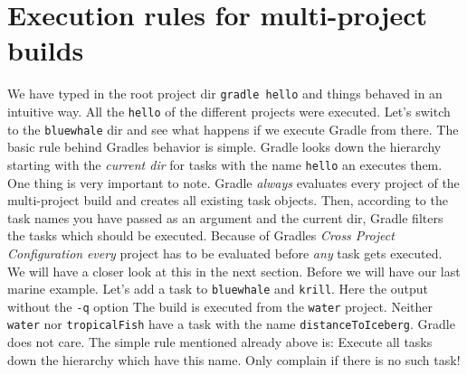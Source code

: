 


\section{Execution rules for multi-project builds} %
\label{sec:execution_rules_for_multi_project_builds}
We have typed in the root project dir \texttt{gradle hello} and things behaved in an intuitive way. All the \texttt{hello} of the different projects were executed. Let's switch to the \texttt{bluewhale} dir and see what happens if we execute Gradle from there. 
The basic rule behind Gradles behavior is simple. Gradle looks down the hierarchy starting with the \emph{current dir} for tasks with the name \texttt{hello} an executes them. One thing is very important to note. Gradle \emph{always} evaluates every project of the multi-project build and creates all existing task objects. Then, according to the task names you have passed as an argument and the current dir, Gradle filters the tasks which should be executed. Because of Gradles \emph{Cross Project Configuration} \emph{every} project has to be evaluated before \emph{any} task gets executed. We will have a closer look at this in the next section. Before we will have our last marine example. Let's add a task to \texttt{bluewhale} and \texttt{krill}.
Here the output without the \texttt{-q} option
The build is executed from the \texttt{water} project. Neither \texttt{water} nor \texttt{tropicalFish} have a task with the name \texttt{distanceToIceberg}. Gradle does not care. The simple rule mentioned already above is: Execute all tasks down the hierarchy which have this name. Only complain if there is no such task!

